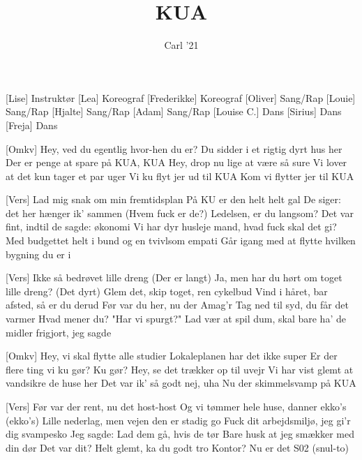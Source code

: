\documentclass[a4paper,11pt]{article}
\title{KUA}
\author{Carl '21}
\begin{document}
\maketitle

\begin{roles}
[Lise] Instruktør
[Lea] Koreograf
[Frederikke] Koreograf
[Oliver] Sang/Rap
[Louie] Sang/Rap
[Hjalte] Sang/Rap
[Adam] Sang/Rap
[Louise C.] Dans
[Sirius] Dans
[Freja] Dans
\end{roles}

\begin{song}


[Omkv] Hey, ved du egentlig hvor-hen du er?
    Du sidder i et rigtig dyrt hus her
    Der er penge at spare på KUA, KUA
    Hey, drop nu lige at være så sure
    Vi lover at det kun tager et par uger
    Vi ku flyt jer ud til KUA
    Kom vi flytter jer til KUA


[Vers] Lad mig snak om min fremtidsplan
    På KU er den helt helt gal
    De siger: det her hænger ik' sammen
    (Hvem fuck er de?) Ledelsen, er du langsom?
    Det var fint, indtil de sagde: økonomi
    Vi har dyr husleje mand, hvad fuck skal det gi?
    Med budgettet helt i bund og en tvivlsom empati
    Går igang med at flytte hvilken bygning du er i

[Vers] Ikke så bedrøvet lille dreng (Der er langt)
    Ja, men har du hørt om toget lille dreng? (Det dyrt)
    Glem det, skip toget, ren cykelbud
    Vind i håret, bar afsted, så er du derud
    Før var du her, nu der Amag'r
    Tag ned til syd, du får det varmer
    Hvad mener du? "Har vi spurgt?"
    Lad vær at spil dum, skal bare ha' de midler frigjort, jeg sagde

[Omkv] Hey, vi skal flytte alle studier
    Lokaleplanen har det ikke super
    Er der flere ting vi ku gør? Ku gør?
    Hey, se det trækker op til uvejr
    Vi har vist glemt at vandsikre de huse her
    Det var ik' så godt nej, uha
    Nu der skimmelsvamp på KUA

[Vers] Før var der rent, nu det host-host
    Og vi tømmer hele huse, danner ekko's (ekko's)
    Lille nederlag, men vejen den er stadig go
    Fuck dit arbejdsmiljø, jeg gi'r dig svampesko
    Jeg sagde: Lad dem gå, hvis de tør
    Bare husk at jeg smækker med din dør
    Det var dit? Helt glemt, ka du godt tro
    Kontor? Nu er det S02 (snul-to)


\end{song}
\end{document}
